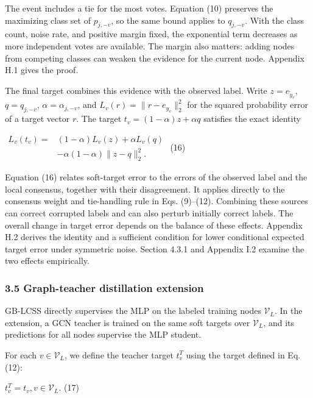 The event includes a tie for the most votes. Equation (10) preserves the maximizing class set of \(p_{j, - v}\), so the same bound applies to \(q_{j, - v}\). With the class count, noise rate, and positive margin fixed, the exponential term decreases as more independent votes are available. The margin also matters: adding nodes from competing classes can weaken the evidence for the current node. Appendix H.1 gives the proof.

The final target combines this evidence with the observed label. Write \(z = e_{{\widetilde{y}}_{v}}\), \(q = q_{j, - v}\), \(\alpha = \alpha_{j, - v}\), and \(L_{v}(r) = \parallel r - e_{y_{v}} \parallel_{2}^{2}\) for the squared probability error of a target vector \(r\). The target \(t_{v} = (1 - \alpha)z + \alpha q\) satisfies the exact identity

\(\begin{aligned}
L_{v}(t_{v}) = & (1 - \alpha)L_{v}(z) + \alpha L_{v}(q) \\
 & - \alpha(1 - \alpha) \parallel z - q \parallel_{2}^{2}.
\end{aligned}\) (16)

Equation (16) relates soft-target error to the errors of the observed label and the local consensus, together with their disagreement. It applies directly to the consensus weight and tie-handling rule in Eqs. (9)--(12). Combining these sources can correct corrupted labels and can also perturb initially correct labels. The overall change in target error depends on the balance of these effects. Appendix H.2 derives the identity and a sufficient condition for lower conditional expected target error under symmetric noise. Section 4.3.1 and Appendix I.2 examine the two effects empirically.

\subsubsection{3.5 Graph-teacher distillation extension}\label{graph-teacher-distillation-extension}

GB-LCSS directly supervises the MLP on the labeled training nodes \(\mathcal{V}_{L}\). In the extension, a GCN teacher is trained on the same soft targets over \(\mathcal{V}_{L}\), and its predictions for all nodes supervise the MLP student.

For each \(v \in \mathcal{V}_{L}\), we define the teacher target \(t_{v}^{T}\) using the target defined in Eq. (12):

\(t_{v}^{T} = t_{v},v \in \mathcal{V}_{L}.\) (17)

